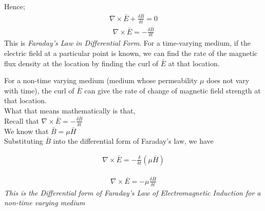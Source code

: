 Hence;
\begin{align*}
\nabla \times \bar{E}+ \frac{\delta \bar{B}}{\delta t} = 0
\end{align*}
\begin{align}
\nabla \times \bar{E} = -\frac{\delta \bar{B}}{\delta t}
\end{align}
This is \emph{Faraday's Law in Differential Form}. For a time-varying medium, if the electric field at a particular point is known, we can find the rate of the magnetic flux density at the location by finding the curl of $\bar{E}$ at that location.

For a non-time varying medium (medium whose permeability $\mu$ does not vary with time), the curl of $\bar{E}$ can give the rate of change of magnetic field strength at that location.\\

What that means mathematically is that,\\


Recall that $\nabla \times \bar{E} = - \frac{\delta\bar{B}}{\delta t}$\\


We know that $\bar{B} = \mu \bar{H}$ $\quad$\\

Substituting $\bar{B}$ into the differential form of Faraday's law, we have	


\begin{align*}
\nabla \times \bar{E} = - \frac{\delta}{\delta t} (\mu\bar{H})
\end{align*}

\begin{align}
\nabla \times \bar{E} = -\mu\frac{\delta \bar{H}}{\delta t}
\end{align}
\emph{This is the Differential form of Faraday's Law of Electromagnetic Induction for a non-time varying medium}

